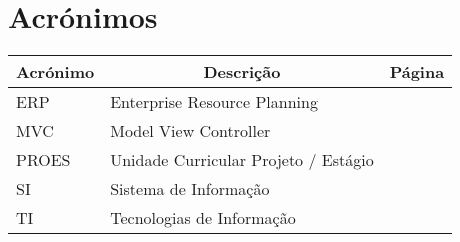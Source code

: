 

\chapter[Acrónimos]{Acrónimos}

\begin{center}
\small
\begin{longtable}{lp{3.0in}c}
\toprule \multicolumn{1}{c}{Acrónimo} 
                & \multicolumn{1}{c}{Descrição}
                                & \multicolumn{1}{c}{Página}\\ \midrule\addlinespace[2pt] \endhead

\bottomrule\endfoot

ERP		& Enterprise Resource Planning			& \pageref{sym:ERP}\\
MVC		& Model View Controller					& \pageref{sym:MVC}\\
PROES	& Unidade Curricular Projeto / Estágio	& \pageref{sym:PROES}\\
SI		& Sistema de Informação					& \pageref{sym:SI}\\
TI		& Tecnologias de Informação				& \pageref{sym:TI}\\


\end{longtable}

\end{center}


